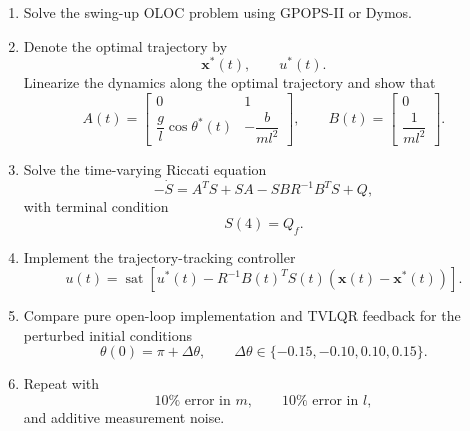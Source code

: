 \begin{enumerate}
    \item Solve the swing-up OLOC problem using GPOPS-II or Dymos.

    \item Denote the optimal trajectory by
    \begin{equation}
    \mathbf{x}^*(t),
    \qquad
    u^*(t).
    \end{equation}
    Linearize the dynamics along the optimal trajectory and show that
    \begin{equation}
    A(t)=
    \begin{bmatrix}
    0&1\\
    \dfrac{g}{l}\cos\theta^*(t)&-\dfrac{b}{ml^2}
    \end{bmatrix},
    \qquad
    B(t)=
    \begin{bmatrix}
    0\\
    \dfrac{1}{ml^2}
    \end{bmatrix}.
    \end{equation}

    \item Solve the time-varying Riccati equation
    \begin{equation}
    -\dot{S}
    =
    A^TS+SA
    -
    SBR^{-1}B^TS
    +
    Q,
    \end{equation}
    with terminal condition
    \begin{equation}
    S(4)=Q_f.
    \end{equation}

    \item Implement the trajectory-tracking controller
    \begin{equation}
    u(t)
    =
    \operatorname{sat}
    \left[
    u^*(t)
    -
    R^{-1}B(t)^TS(t)
    \left(
    \mathbf{x}(t)-\mathbf{x}^*(t)
    \right)
    \right].
    \end{equation}

    \item Compare pure open-loop implementation and TVLQR feedback for
    the perturbed initial conditions
    \begin{equation}
    \theta(0)=\pi+\Delta\theta,
    \qquad
    \Delta\theta\in
    \{-0.15,-0.10,0.10,0.15\}.
    \end{equation}

    \item Repeat with
    \begin{equation}
    10\% \text{ error in }m,
    \qquad
    10\% \text{ error in }l,
    \end{equation}
    and additive measurement noise.


\end{enumerate}
